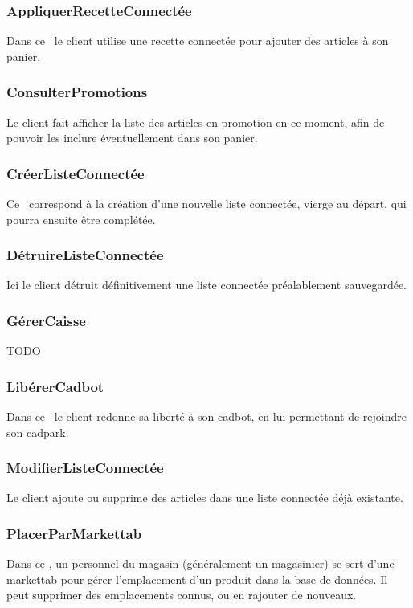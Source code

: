 \subsubsection{AppliquerRecetteConnectée}
Dans ce  \cu\ le client utilise une recette connectée pour ajouter des articles à son panier.

\subsubsection{ConsulterPromotions}
Le client fait afficher la liste des articles en promotion en ce moment, afin de pouvoir les inclure éventuellement dans son panier.

\subsubsection{CréerListeConnectée}
Ce \cu\ correspond à la création d'une nouvelle liste connectée, vierge au départ, qui pourra ensuite être complétée.

\subsubsection{DétruireListeConnectée}
Ici le client détruit définitivement une liste connectée préalablement sauvegardée.

\subsubsection{GérerCaisse}
TODO

\subsubsection{LibérerCadbot}
Dans ce \cu\ le client redonne sa liberté à son cadbot, en lui permettant de rejoindre son cadpark.

\subsubsection{ModifierListeConnectée}
Le client ajoute ou supprime des articles dans une liste connectée déjà existante.

\subsubsection{PlacerParMarkettab}
Dans ce \cu, un personnel du magasin (généralement un magasinier) se sert d'une markettab pour gérer l'emplacement d'un produit dans la base de données.
Il peut supprimer des emplacements connus, ou en rajouter de nouveaux.

